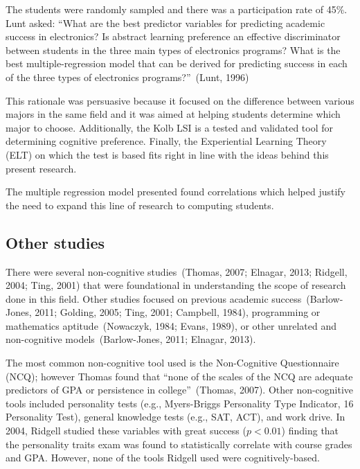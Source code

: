 The students were randomly sampled and there was a participation rate of 45\%. Lunt asked: ``What are the best predictor variables for predicting academic success in electronics? Is abstract learning preference an effective discriminator between students in the three main types of electronics programs? What is the best multiple-regression model that can be derived for predicting success in each of the three types of electronics programs?''~(Lunt, 1996)

This rationale was persuasive because it focused on the difference between various majors in the same field and it was aimed at helping students determine which major to choose. Additionally, the Kolb LSI is a tested and validated tool for determining cognitive preference. Finally, the Experiential Learning Theory (ELT) on which the test is based fits right in line with the ideas behind this present research.

The multiple regression model presented found correlations which helped justify the need to expand this line of research to computing students.

\subsection{Other studies}
There were several non-cognitive studies~(Thomas, 2007; Elnagar, 2013; Ridgell, 2004; Ting, 2001) that were foundational in understanding the scope of research done in this field. Other studies focused on previous academic success~(Barlow-Jones, 2011; Golding, 2005; Ting, 2001; Campbell, 1984), programming or mathematics aptitude~(Nowaczyk, 1984; Evans, 1989), or other unrelated and non-cognitive models~(Barlow-Jones, 2011; Elnagar, 2013).

The most common non-cognitive tool used is the Non-Cognitive Questionnaire (NCQ); however Thomas found that ``none of the scales of the NCQ are adequate predictors of GPA or persistence in college''~(Thomas, 2007). Other non-cognitive tools included personality tests (e.g., Myers-Briggs Personality Type Indicator, 16 Personality Test), general knowledge tests (e.g., SAT, ACT), and work drive. In 2004, Ridgell studied these variables with great success ($p<0.01$) finding that the personality traits exam was found to statistically correlate with course grades and GPA. However, none of the tools Ridgell used were cognitively-based.

